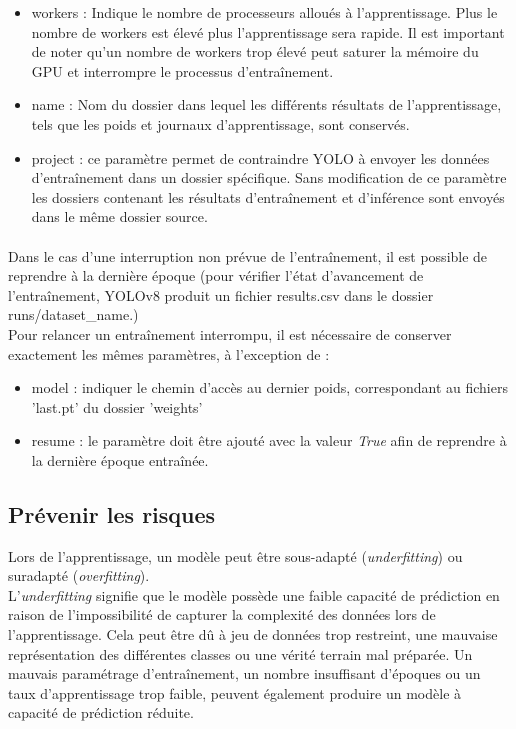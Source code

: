 \documentclass[12pt,twoside]{book}
\begin{document}
\begin{itemize}
    \item workers : Indique le nombre de processeurs alloués à l'apprentissage. Plus le nombre de workers est élevé plus l’apprentissage sera rapide. Il est important de noter qu’un nombre de workers trop élevé peut saturer la mémoire du GPU et interrompre le processus d’entraînement.
    \item name : Nom du dossier dans lequel les différents résultats de l'apprentissage, tels que les poids et journaux d'apprentissage, sont conservés.
    \item project : ce paramètre permet de contraindre YOLO à envoyer les données d’entraînement dans un dossier spécifique. Sans modification de ce paramètre les dossiers contenant les résultats d’entraînement et d’inférence sont envoyés dans le même dossier source. 
\end{itemize}

\paragraph{}Dans le cas d’une interruption non prévue de l’entraînement, il est possible de reprendre à la dernière époque (pour vérifier l’état d’avancement de l’entraînement, YOLOv8 produit un fichier results.csv dans le dossier runs/dataset\_name.) \\

Pour relancer un entraînement interrompu, il est nécessaire de conserver exactement les mêmes paramètres, à l’exception de : \\
\begin{itemize}
    \item model : indiquer le chemin d'accès au dernier poids, correspondant au fichiers 'last.pt' du dossier 'weights'
    \item resume : le paramètre doit être ajouté avec la valeur \textit{True} afin de reprendre à la dernière époque entraînée.
\end{itemize}

\subsection{Prévenir les risques}

Lors de l'apprentissage, un modèle peut être sous-adapté (\textit{underfitting}) ou suradapté (\textit{overfitting}).\\

L'\textit{underfitting} signifie que le modèle possède une faible capacité de prédiction en raison de l'impossibilité de capturer la complexité des données lors de l'apprentissage. Cela peut être dû à jeu de données trop restreint, une mauvaise représentation des différentes classes ou une vérité terrain mal préparée. Un mauvais paramétrage d’entraînement, un nombre insuffisant d’époques ou un taux d'apprentissage trop faible, peuvent également produire un modèle à capacité de prédiction réduite. 
\end{document}
